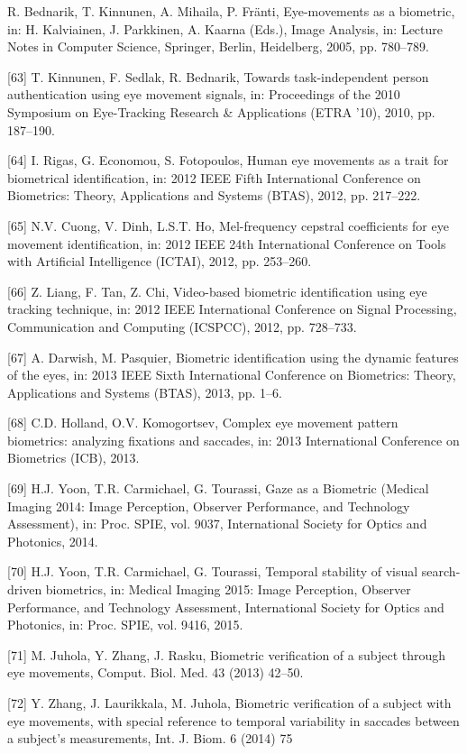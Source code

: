 \documentclass{article}
\begin{document}
\begin{raggedright}
[62] R. Bednarik, T. Kinnunen, A. Mihaila, P. Fränti, Eye-movements as a biometric, in: H. Kalviainen, J. Parkkinen, A. Kaarna (Eds.), Image Analysis, in: Lecture Notes in Computer Science, Springer, Berlin, Heidelberg, 2005, pp. 780–789.

[63] T. Kinnunen, F. Sedlak, R. Bednarik, Towards task-independent person authentication using eye movement signals, in: Proceedings of the 2010 Symposium on Eye-Tracking Research \& Applications (ETRA '10), 2010, pp. 187–190. 

[64] I. Rigas, G. Economou, S. Fotopoulos, Human eye movements as a trait for biometrical identification, in: 2012 IEEE Fifth International Conference on Biometrics: Theory, Applications and Systems (BTAS), 2012, pp. 217–222.

[65] N.V. Cuong, V. Dinh, L.S.T. Ho, Mel-frequency cepstral coefficients for eye movement identification, in: 2012 IEEE 24th International Conference on Tools with Artificial Intelligence (ICTAI), 2012, pp. 253–260.

[66] Z. Liang, F. Tan, Z. Chi, Video-based biometric identification using eye tracking technique, in: 2012 IEEE International Conference on Signal Processing, Communication and Computing (ICSPCC), 2012, pp. 728–733.

[67] A. Darwish, M. Pasquier, Biometric identification using the dynamic features of the eyes, in: 2013 IEEE Sixth International Conference on Biometrics: Theory, Applications and Systems (BTAS), 2013, pp. 1–6.

[68] C.D. Holland, O.V. Komogortsev, Complex eye movement pattern biometrics: analyzing fixations and saccades, in: 2013 International Conference on Biometrics (ICB), 2013.

[69] H.J. Yoon, T.R. Carmichael, G. Tourassi, Gaze as a Biometric (Medical Imaging 2014: Image Perception, Observer Performance, and Technology Assessment), in: Proc. SPIE, vol. 9037, International Society for Optics and Photonics, 2014.

[70] H.J. Yoon, T.R. Carmichael, G. Tourassi, Temporal stability of visual search-driven biometrics, in: Medical Imaging 2015: Image Perception, Observer Performance, and Technology Assessment, International Society for Optics and Photonics, in: Proc. SPIE, vol. 9416, 2015.

[71] M. Juhola, Y. Zhang, J. Rasku, Biometric verification of a subject through eye movements, Comput. Biol. Med. 43 (2013) 42–50.

[72] Y. Zhang, J. Laurikkala, M. Juhola, Biometric verification of a subject with eye movements, with special reference to temporal variability in saccades between a subject's measurements, Int. J. Biom. 6 (2014) 75


\end{raggedright}
\end{document}
